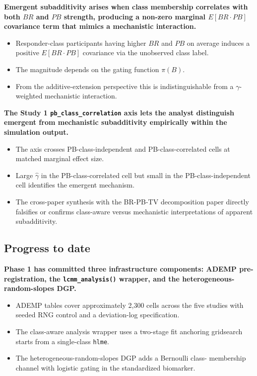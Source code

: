\documentclass[
  11pt,
]{article}
\begin{document}
\textbf{Emergent subadditivity arises when class membership correlates
with both $BR$ and $PB$ strength, producing a non-zero marginal
$E[BR \cdot PB]$ covariance term that mimics a mechanistic
interaction.}

\begin{itemize}\setlength{\itemsep}{2pt}\setlength{\parskip}{0pt}
\item Responder-class participants having higher $BR$ and $PB$ on
  average induces a positive $E[BR \cdot PB]$ covariance via the
  unobserved class label.
\item The magnitude depends on the gating function $\pi(B)$.
\item From the additive-extension perspective this is
  indistinguishable from a $\gamma$-weighted mechanistic interaction.
\end{itemize}

\textbf{The Study 1 \texttt{pb\_class\_correlation} axis lets the
analyst distinguish emergent from mechanistic subadditivity empirically
within the simulation output.}

\begin{itemize}\setlength{\itemsep}{2pt}\setlength{\parskip}{0pt}
\item The axis crosses PB-class-independent and PB-class-correlated
  cells at matched marginal effect size.
\item Large $\hat{\gamma}$ in the PB-class-correlated cell but small
  in the PB-class-independent cell identifies the emergent mechanism.
\item The cross-paper synthesis with the BR-PB-TV decomposition paper
  directly falsifies or confirms class-aware versus mechanistic
  interpretations of apparent subadditivity.
\end{itemize}

\subsection{Progress to date}\label{progress-to-date}

\textbf{Phase 1 has committed three infrastructure components: ADEMP
pre-registration, the \texttt{lcmm\_analysis()} wrapper, and the
heterogeneous-random-slopes DGP.}

\begin{itemize}\setlength{\itemsep}{2pt}\setlength{\parskip}{0pt}
\item ADEMP tables cover approximately 2,300 cells across the five
  studies with seeded RNG control and a deviation-log specification.
\item The class-aware analysis wrapper uses a two-stage fit anchoring
  gridsearch starts from a single-class \texttt{hlme}.
\item The heterogeneous-random-slopes DGP adds a Bernoulli class-
  membership channel with logistic gating in the standardized
  biomarker.
\end{itemize}
\end{document}
